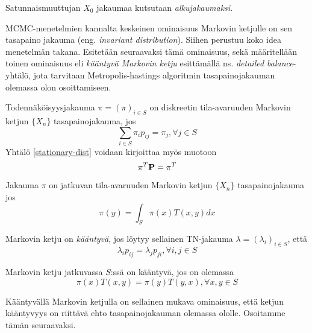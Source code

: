 \begin{maar}
	Satunnaismuuttujan $X_0$ jakaumaa kutsutaan \textit{alkujakaumaksi}. 
\end{maar}

MCMC-menetelmien kannalta keskeinen ominaisuus Markovin ketjulle on sen tasapaino jakauma (eng. \textit{invariant distribution}). Siihen perustuu koko idea menetelmän takana. Esitetään seuraavaksi tämä ominaisuus, sekä määritellään toinen ominaisuus eli \textit{kääntyvä Markovin ketju} esittämällä ns. \textit{detailed balance}-yhtälö, jota tarvitaan Metropolis-hastings algoritmin tasapainojakauman olemassa olon osoittamiseen. 

\begin{maar}
	Todennäköisyysjakauma $\pi=(\pi)_{i\in S}$ on diskreetin tila-avaruuden Markovin ketjun $\{X_n\}$ tasapainojakauma, jos 
	\begin{equation}\label{stationary-dist}
		\sum_{i\in S} \pi_i p_{ij}=\pi_j, \forall j\in S
	\end{equation}
	Yhtälö \ref{stationary-dist} voidaan kirjoittaa myös muotoon 
	\begin{equation}\label{stationary-dist2}
		\pi^T\textbf{P}= \pi^T
	\end{equation}
	
	Jakauma $\pi$ on jatkuvan tila-avaruuden Markovin ketjun $\{ X_n \}$ tasapainojakauma jos 
	\begin{equation}
		\pi(y) = \int_S \pi(x) T(x,y) dx
	\end{equation}
\end{maar}

\begin{maar}\label{kaant-disk}
	Markovin ketju on \textit{kääntyvä}, jos löytyy sellainen TN-jakauma $\lambda=(\lambda_i)_{i\in S}$, että 
	\begin{equation}
		\lambda_ip_{ij}= \lambda_jp_{ji},\forall i,j\in S
	\end{equation}
\end{maar}

\begin{maar}\label{kaant-jatk}
	Markovin ketju jatkuvassa $S$:ssä on kääntyvä, jos on olemassa 
	\begin{equation}
		\pi(x)T(x,y)=\pi(y)T(y,x), \forall x,y\in S
	\end{equation}
\end{maar}

Kääntyvällä Markovin ketjulla on sellainen mukava ominaisuus, että ketjun kääntyvyys on riittävä ehto tasapainojakauman olemassa ololle. Osoitamme tämän seuraavaksi.

